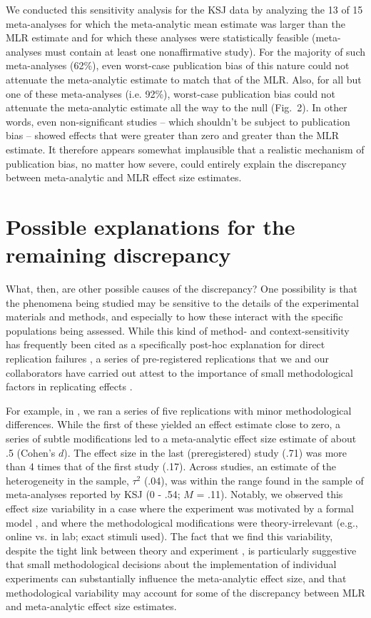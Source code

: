 \documentclass[man]{apa7}
\begin{document}
We conducted this sensitivity analysis for the KSJ data by analyzing the 13 of 15 meta-analyses for which the meta-analytic mean estimate was larger than the MLR estimate and for which these analyses were statistically feasible (meta-analyses must contain at least one nonaffirmative study). For the majority of such meta-analyses (62\%), even worst-case publication bias of this nature could not attenuate the meta-analytic estimate to match that of the MLR. Also, for all but one of these meta-analyses (i.e. 92\%), worst-case publication bias could not attenuate the meta-analytic estimate all the way to the null (Fig.\ 2). In other words, even non-significant studies -- which shouldn't be subject to publication bias -- showed effects that were greater than zero and greater than the MLR estimate. It therefore appears somewhat implausible that a realistic mechanism of publication bias, no matter how severe, could entirely explain the discrepancy between meta-analytic and MLR effect size estimates.

\section{Possible explanations for the remaining discrepancy}

What, then, are other possible causes of the discrepancy? One possibility is that the phenomena being studied may be sensitive to the details of the experimental materials and methods, and especially to how these interact with the specific populations being assessed. While this kind of method- and context-sensitivity has frequently been cited as a specifically post-hoc explanation for direct replication failures \parencite{van2016contextual}, a series of pre-registered replications that we and our collaborators have carried out attest to the importance of small methodological factors in replicating effects \parencite{lewis2018still,lewis2016understanding,phillips2015second}. 

For example, in \Textcite{lewis2016understanding}, we ran a series of five replications with minor methodological differences. While the first of these yielded an effect estimate close to zero, a series of subtle modifications led to a meta-analytic effect size estimate of about .5 (Cohen's $d$). The effect size in the last (preregistered) study (.71) was more than 4 times that of the first study (.17).   Across studies,  an estimate of the heterogeneity in the sample,  $\tau^{2}$ (.04), was within the range found in the sample of meta-analyses reported by KSJ (0 - .54; $M$ = .11). Notably, we observed this effect size variability in a case where the experiment was motivated by a formal model \parencite{xu2007word}, and where the methodological modifications were theory-irrelevant (e.g., online vs. in lab; exact stimuli used). The fact that we find this variability, despite the tight link between theory and experiment \parencite{oberauer2019addressing}, is particularly suggestive that small methodological decisions about the implementation of individual experiments can substantially influence the meta-analytic effect size, and that methodological variability may account for some of the discrepancy between MLR and meta-analytic effect size estimates.
\end{document}
